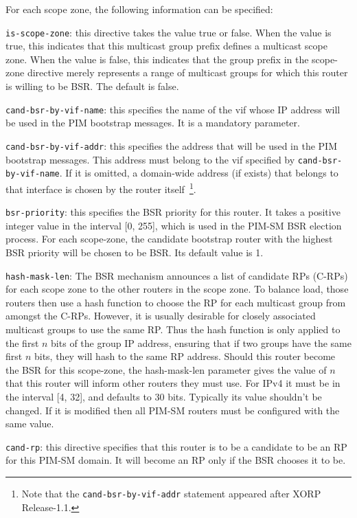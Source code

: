 \begin{description}
\begin{description}
\begin{description}
  For each scope zone, the following information can be specified: 
\begin{description}
\item{\tt is-scope-zone}: this directive takes the value {\stt true}
  or {\stt false}.  When the value is {\stt true}, this indicates that
  this multicast group prefix defines a multicast scope zone.  When
  the value is {\stt false}, this indicates that the group prefix in
  the {\stt scope-zone} directive merely represents a range of
  multicast groups for which this router is willing to be BSR.  The
  default is {\stt false}.
\item{\tt cand-bsr-by-vif-name}: this specifies the name of the {\stt
  vif} whose IP address will be used in the PIM bootstrap messages.  It
  is a mandatory parameter.
\item{\tt cand-bsr-by-vif-addr}: this specifies the address that will be used
  in the PIM bootstrap messages. This address must belong to the vif
  specified by {\tt cand-bsr-by-vif-name}. If it is omitted, a domain-wide
  address (if exists) that belongs to that interface is chosen by the router
  itself~\footnote{Note that the {\tt cand-bsr-by-vif-addr} statement
  appeared after XORP Release-1.1.}.
\item{\tt bsr-priority}: this specifies the BSR priority for this
  router.  It takes a positive integer value in the interval [0, 255],
  which is used in the
  PIM-SM BSR election process.  For each {\stt scope-zone}, the
  candidate bootstrap router with the highest BSR priority will be
  chosen to be BSR. Its default value is 1.
\item{\tt hash-mask-len}: The BSR mechanism announces a list of
  candidate RPs (C-RPs) for each scope zone to the other routers in
  the scope zone.  To balance load, those routers then use a hash
  function to choose the RP for each multicast group from amongst the
  C-RPs.  However, it is usually desirable for closely associated
  multicast groups to use the same RP.  Thus the hash function is only
  applied to the first $n$ bits of the group IP address, ensuring that
  if two groups have the same first $n$ bits, they will hash to the
  same RP address.  Should this router become the BSR for this
  scope-zone, the {\stt hash-mask-len} parameter gives the value of
  $n$ that this router will inform other routers they must use.
  For IPv4 it must be in the interval [4, 32], and defaults to 30 bits.
  Typically its value shouldn't be changed.
  If it is modified then all PIM-SM routers must be configured with the
  same value.
\end{description}
\end{description}
\end{description}
\item{\tt cand-rp}: this directive specifies that this router is to be
  a candidate to be an RP for this PIM-SM domain.  It will become an
  RP only if the BSR chooses it to be.  


\end{description}
